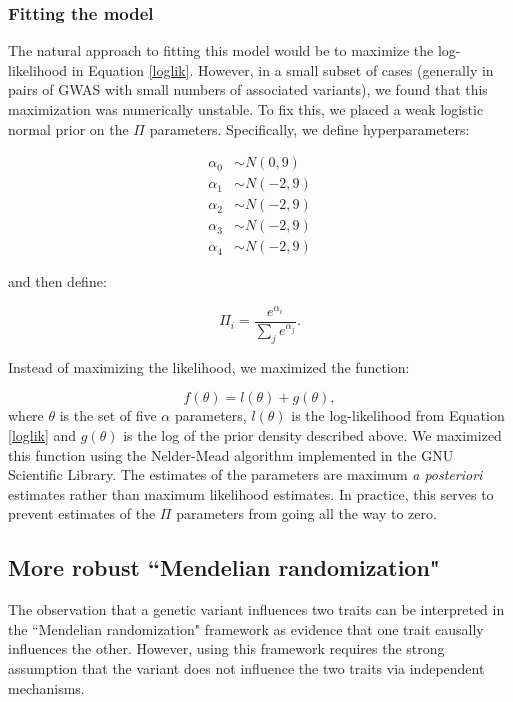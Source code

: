 \documentclass[11pt,titlepage]{article}
\begin{document}
\subsubsection{Fitting the model}\label{map}
The natural approach to fitting this model would be to maximize the log-likelihood in Equation \ref{loglik}. However, in a small subset of cases (generally in pairs of GWAS with small numbers of associated variants), we found that this maximization was numerically unstable. To fix this, we placed a weak logistic normal prior on the $\Pi$ parameters. Specifically, we define hyperparameters:

\begin{align}
\alpha_0 &\sim N(0, 9) \\
\alpha_1 &\sim N(-2, 9)\\
\alpha_2 &\sim N(-2, 9)\\
\alpha_3 &\sim N(-2, 9)\\
\alpha_4 &\sim N(-2, 9)
\end{align}

\noindent and then define:

\begin{equation} 
\Pi_i = \frac{e^{\alpha_i}}{\sum_j e^{\alpha_j}}.
\end{equation}

Instead of maximizing the likelihood, we maximized the function:

\begin{equation}
f(\theta) = l(\theta) + g(\theta),
\end{equation}
where $\theta$ is the set of five $\alpha$ parameters, $l(\theta)$ is the log-likelihood from Equation \ref{loglik} and $g(\theta)$ is the log of the prior density described above. We maximized this function using the Nelder-Mead algorithm implemented in the GNU Scientific Library. The estimates of the parameters are maximum \emph{a posteriori} estimates rather than maximum likelihood estimates. In practice, this serves to prevent estimates of the $\Pi$ parameters from going all the way to zero. 


\subsection{More robust ``Mendelian randomization"}
The observation that a genetic variant influences two traits can be interpreted in the ``Mendelian randomization" framework as evidence that one trait causally influences the other. However, using this framework requires the strong assumption that the variant does not influence the two traits via independent mechanisms. 
\end{document}
